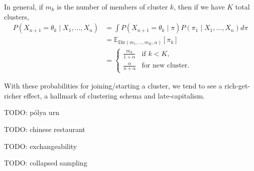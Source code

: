 \documentclass[twoside]{article}
\newcommand{\Dir}{\mathrm{Dir}}
\newcommand{\todo}[1]{{\color{red} TODO: #1}}
\begin{document}
In general, if $m_k$ is the number of members of cluster $k$, then if we have $K$ total clusters,
\begin{align*}
   P(X_{n+1} = \theta_k \mid X_1,\ldots,X_n)
&= \int P(X_{n+1} = \theta_k \mid \pi) P(\pi_1 \mid X_1,\ldots,X_n) d\pi  \\
&= \mathbb{E}_{\Dir(m_1,\ldots,m_K,\alpha)}[\pi_k] \\
&= \begin{cases}
    \frac{m_k}{1+\alpha} & \text{if } k<K,\\
    \frac{\alpha}{n+\alpha} & \text{for new cluster}.
\end{cases}
\end{align*}

With these probabilities for joining/starting a cluster, we tend to see a rich-get-richer effect, a hallmark of clustering schema and late-capitalism.

\todo{p\'olya urn}

\todo{chinese restaurant}

\todo{exchangeability}

\todo{collapsed sampling}
\end{document}
